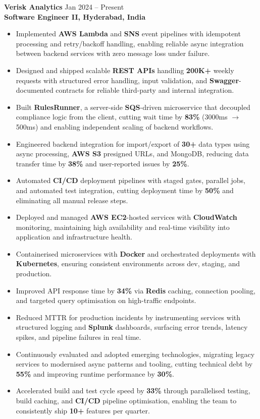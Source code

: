 \documentclass[a4paper,10pt]{article}
\begin{document}
\textbf{Verisk Analytics} \hfill Jan 2024 -- Present \\
\textbf{Software Engineer II, Hyderabad, India}
\begin{itemize}[leftmargin=*]
    \item Implemented \textbf{AWS Lambda} and \textbf{SNS} event pipelines with idempotent processing and retry/backoff handling, enabling reliable async integration between backend services with zero message loss under failure.
    \item Designed and shipped scalable \textbf{REST APIs} handling \textbf{200K+} weekly requests with structured error handling, input validation, and \textbf{Swagger}-documented contracts for reliable third-party and internal integration.
    \item Built \textbf{RulesRunner}, a server-side \textbf{SQS}-driven microservice that decoupled compliance logic from the client, cutting wait time by \textbf{83\%} (3000ms $\rightarrow$ 500ms) and enabling independent scaling of backend workflows.
    \item Engineered backend integration for import/export of \textbf{30+} data types using async processing, \textbf{AWS S3} presigned URLs, and MongoDB, reducing data transfer time by \textbf{38\%} and user-reported issues by \textbf{25\%}.
    \item Automated \textbf{CI/CD} deployment pipelines with staged gates, parallel jobs, and automated test integration, cutting deployment time by \textbf{50\%} and eliminating all manual release steps.
    \item Deployed and managed \textbf{AWS EC2}-hosted services with \textbf{CloudWatch} monitoring, maintaining high availability and real-time visibility into application and infrastructure health.
    \item Containerised microservices with \textbf{Docker} and orchestrated deployments with \textbf{Kubernetes}, ensuring consistent environments across dev, staging, and production.
    \item Improved API response time by \textbf{34\%} via \textbf{Redis} caching, connection pooling, and targeted query optimisation on high-traffic endpoints.
    \item Reduced MTTR for production incidents by instrumenting services with structured logging and \textbf{Splunk} dashboards, surfacing error trends, latency spikes, and pipeline failures in real time.
    \item Continuously evaluated and adopted emerging technologies, migrating legacy services to modernised async patterns and tooling, cutting technical debt by \textbf{55\%} and improving runtime performance by \textbf{30\%}.
    \item Accelerated build and test cycle speed by \textbf{33\%} through parallelised testing, build caching, and \textbf{CI/CD} pipeline optimisation, enabling the team to consistently ship \textbf{10+} features per quarter.
\end{itemize}
\end{document}
